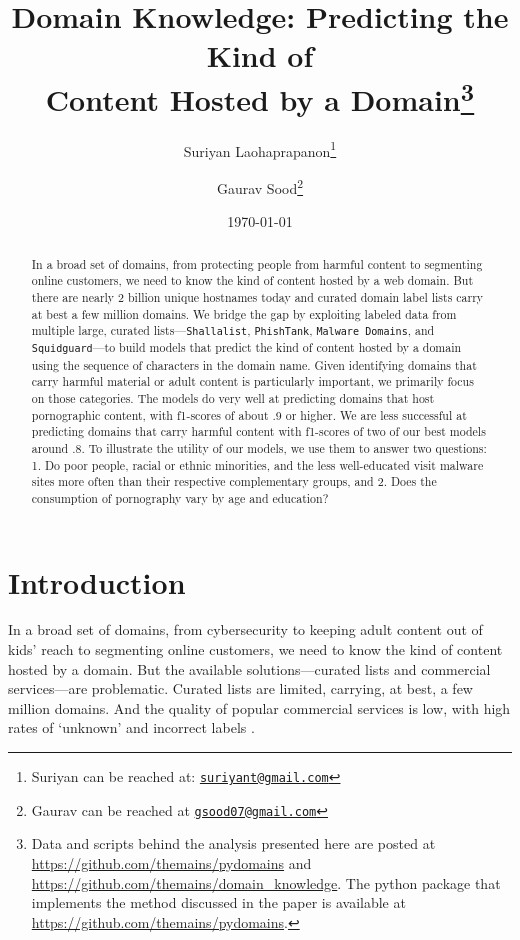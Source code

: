 \documentclass[12pt, letterpaper]{article}
\title{\Large{Domain Knowledge: Predicting the Kind of\\Content Hosted by a Domain}\footnote{Data and scripts behind the analysis presented here are posted at \url{https://github.com/themains/pydomains} and \url{https://github.com/themains/domain_knowledge}. The python package that implements the method discussed in the paper is available at \url{https://github.com/themains/pydomains}.}}
\author{Suriyan Laohaprapanon\thanks{Suriyan can be reached at: \href{mailto:suriyant@gmail.com}{\footnotesize{\texttt{suriyant@gmail.com}}}}\vspace{.5cm} \and Gaurav Sood\thanks{Gaurav can be reached at \href{mailto:gsood07@gmail.com}{\footnotesize{\texttt{gsood07@gmail.com}}}}}
\date{\vspace{.5cm}\normalsize{\today}}
\begin{document}
\maketitle

\begin{abstract}

In a broad set of domains, from protecting people from harmful content to segmenting online customers, we need to know the kind of content hosted by a web domain. But there are nearly 2 billion unique hostnames today and curated domain label lists carry at best a few million domains. We bridge the gap by exploiting labeled data from multiple large, curated lists---\texttt{Shallalist}, \texttt{PhishTank}, \texttt{Malware Domains}, and \texttt{Squidguard}---to build models that predict the kind of content hosted by a domain using the sequence of characters in the domain name. Given identifying domains that carry harmful material or adult content is particularly important, we primarily focus on those categories. The models do very well at predicting domains that host pornographic content, with f1-scores of about .9 or higher. We are less successful at predicting domains that carry harmful content with f1-scores of two of our best models around .8. To illustrate the utility of our models, we use them to answer two questions: 1. Do poor people, racial or ethnic minorities, and the less well-educated visit malware sites more often than their respective complementary groups, and 2. Does the consumption of pornography vary by age and education?

\end{abstract}
\doublespace
\section{Introduction}
In a broad set of domains, from cybersecurity to keeping adult content out of kids' reach to segmenting online customers, we need to know the kind of content hosted by a domain.  But the available solutions---curated lists and commercial services---are problematic. Curated lists are limited, carrying, at best, a few million domains. And the quality of popular commercial services is low, with high rates of `unknown' and incorrect labels \citep{deri2015implementing}.
\end{document}
